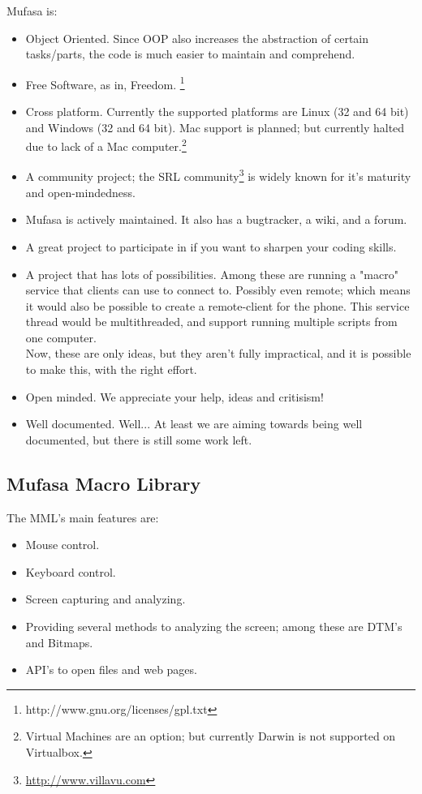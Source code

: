 \documentclass[a4paper, 10pt]{report} %
\begin{document}
Mufasa is:
\begin{itemize}
	\item Object Oriented. Since OOP also increases the abstraction of
		  certain tasks/parts, the code is much easier to maintain and
		  comprehend.
	\item Free Software, as in, Freedom.
			\footnote{http://www.gnu.org/licenses/gpl.txt}
	\item Cross platform. Currently the supported platforms are Linux 
		  (32 and 64 bit) and Windows (32 and 64 bit).
		  Mac support is planned; but currently halted due to lack of a
		  Mac computer.\footnote{Virtual Machines are an option;
		  but currently Darwin is not supported on Virtualbox.}
	\item A community project; the SRL community\footnote{
			\url{http://www.villavu.com}}
		  is widely known for it's maturity and open-mindedness.
	\item Mufasa is actively maintained. It also has a bugtracker,
		  a wiki, and a forum.
	\item A great project to participate in if you want to sharpen your
		  coding skills.
		  \pagebreak
	\item A project that has lots of possibilities. Among these are
		  running a "macro" service that clients can use to 
		  connect to. Possibly even remote; which means it would
		  also be possible to create a remote-client for the phone.
		  This service thread would be multithreaded, and support
		  running multiple scripts from one computer. \\
		  Now, these are only ideas, but they aren't fully impractical,
		  and it is possible to make this, with the right effort. \\
	\item Open minded. We appreciate your help, ideas and critisism!
	\item Well documented. Well... At least we are aiming towards being
		  well documented, but there is still some work left.
\end{itemize}

\pagebreak

\subsection{Mufasa Macro Library}

The MML's main features are:
\begin{itemize}
	\item Mouse control.
	\item Keyboard control.
	\item Screen capturing and analyzing.
	\item Providing several methods to analyzing the screen; among these
		  are DTM's and Bitmaps.
	\item API's to open files and web pages.
\end{itemize}
\end{document}
